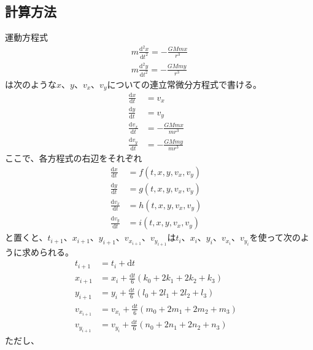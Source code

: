 \documentclass[a4paper,twoside]{jarticle}
\begin{document}
\subsection{計算方法}
運動方程式
\begin{align}
  m\frac{\mathrm{d}^2 x}{\mathrm{d}t^2}=-\frac{GMmx}{r^3}\\
  m\frac{\mathrm{d}^2 y}{\mathrm{d}t^2}=-\frac{GMmy}{r^3}
\end{align}
は次のような$x$、$y$、$v_x$、$v_y$についての連立常微分方程式で書ける。
\begin{align}
  \frac{\mathrm{d}x}{\mathrm{d}t}&=v_x&\\
  \frac{\mathrm{d}y}{\mathrm{d}t}&=v_y&\\
  \frac{\mathrm{d}v_x}{\mathrm{d}t}&=-\frac{GMmx}{mr^3}&\\
  \frac{\mathrm{d}v_y}{\mathrm{d}t}&=-\frac{GMmy}{mr^3}&
\end{align}
ここで、各方程式の右辺をそれぞれ
\begin{align}
  \frac{\mathrm{d}x}{\mathrm{d}t}&=f\left(t,x,y,v_x,v_y\right)&\\
  \frac{\mathrm{d}y}{\mathrm{d}t}&=g\left(t,x,y,v_x,v_y\right)&\\
  \frac{\mathrm{d}v_x}{\mathrm{d}t}&=h\left(t,x,y,v_x,v_y\right)&\\
  \frac{\mathrm{d}v_y}{\mathrm{d}t}&=i\left(t,x,y,v_x,v_y\right)&
\end{align}
と置くと、$t_{i+1}$、$x_{i+1}$、$y_{i+1}$、$v_{x_{i+1}}$、$v_{y_{i+1}}$は$t_{i}$、$x_{i}$、$y_{i}$、$v_{x_{i}}$、$v_{y_{i}}$を使って次のように求められる。
\begin{align}
  t_{i+1}&=t_{i}+\mathrm{d}t&\\
  x_{i+1}&=x_{i}+\frac{\mathrm{d}t}{6}\left(k_0+2k_1+2k_2+k_3\right)&\\
  y_{i+1}&=y_{i}+\frac{\mathrm{d}t}{6}\left(l_0+2l_1+2l_2+l_3\right)&\\
  v_{x_{i+1}}&=v_{x_{i}}+\frac{\mathrm{d}t}{6}\left(m_0+2m_1+2m_2+m_3\right)&\\
  v_{y_{i+1}}&=v_{y_{i}}+\frac{\mathrm{d}t}{6}\left(n_0+2n_1+2n_2+n_3\right)&
\end{align}
ただし、
\footnotesize
\end{document}
